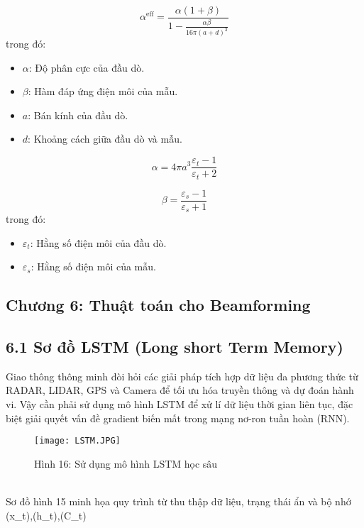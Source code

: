 \documentclass[a4paper,13pt]{article} %
\begin{document}
\begin{equation}
\alpha^{\text{eff}} = \frac{\alpha (1 + \beta)}{1 - \frac{\alpha \beta}{16 \pi (a + d)^3}} \tag{9}\label{eq:effective_polarizability}
\end{equation}
trong đó:
\begin{itemize}
    \item \( \alpha \): Độ phân cực của đầu dò.
    \item \( \beta \): Hàm đáp ứng điện môi của mẫu.
    \item \( a \): Bán kính của đầu dò.
    \item \( d \): Khoảng cách giữa đầu dò và mẫu.
\end{itemize} 

\begin{equation}
\alpha = 4 \pi a^3 \frac{\varepsilon_t - 1}{\varepsilon_t + 2} \tag{10}\label{eq:polarizability}
\end{equation}

\begin{equation}
\beta = \frac{\varepsilon_s - 1}{\varepsilon_s + 1} \tag{11}\label{eq:dielectric_response}
\end{equation}
trong đó:
\begin{itemize}
    \item \( \varepsilon_t \): Hằng số điện môi của đầu dò.
    \item \( \varepsilon_s \): Hằng số điện môi của mẫu.
\end{itemize}


\clearpage
\begin{center}
    \section{Chương 6: Thuật toán cho Beamforming}
\end{center}

\subsection{6.1 Sơ đồ LSTM (Long short Term Memory)}
Giao thông thông minh đòi hỏi các giải pháp tích hợp dữ liệu đa phương thức từ RADAR, LIDAR, GPS và Camera để tối ưu hóa truyền thông và dự đoán hành vi. Vậy cần phải sử dụng mô hình LSTM để xử lí dữ liệu thời gian liên tục, đặc biệt giải quyết vấn đề gradient biến mất trong mạng nơ-ron tuần hoàn (RNN). 
\begin{figure}[htbp]
    \centering
    \texttt{[image: LSTM.JPG]}
    \caption*{Hình 16: Sử dụng mô hình LSTM học sâu }
    \label{fig:model}
\end{figure}\\
Sơ đồ hình 15 minh họa quy trình từ thu thập dữ liệu, trạng thái ẩn và bộ nhớ (x_t),(h_t),(C_t) \\
\end{document}
